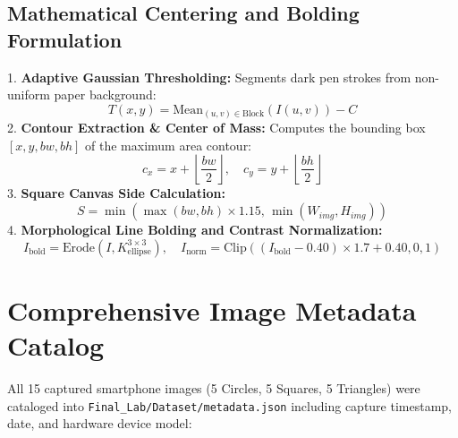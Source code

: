 \documentclass[11pt,a4paper,oneside]{report}
\begin{document}
\subsection{Mathematical Centering and Bolding Formulation}
1. \textbf{Adaptive Gaussian Thresholding:} Segments dark pen strokes from non-uniform paper background:
\begin{equation}
    T(x, y) = \text{Mean}_{(u,v) \in \text{Block}}(I(u, v)) - C
\end{equation}
2. \textbf{Contour Extraction \& Center of Mass:} Computes the bounding box $[x, y, bw, bh]$ of the maximum area contour:
\begin{equation}
    c_x = x + \left\lfloor \frac{bw}{2} \right\rfloor, \quad c_y = y + \left\lfloor \frac{bh}{2} \right\rfloor
\end{equation}
3. \textbf{Square Canvas Side Calculation:}
\begin{equation}
    S = \min\left( \max(bw, bh) \times 1.15, \, \min(W_{img}, H_{img}) \right)
\end{equation}
4. \textbf{Morphological Line Bolding and Contrast Normalization:}
\begin{equation}
    I_{\text{bold}} = \text{Erode}(I, K_{\text{ellipse}}^{3\times 3}), \quad I_{\text{norm}} = \text{Clip}((I_{\text{bold}} - 0.40)\times 1.7 + 0.40, 0, 1)
\end{equation}

\section{Comprehensive Image Metadata Catalog}
All 15 captured smartphone images (5 Circles, 5 Squares, 5 Triangles) were cataloged into \texttt{Final\_Lab/Dataset/metadata.json} including capture timestamp, date, and hardware device model:
\end{document}
